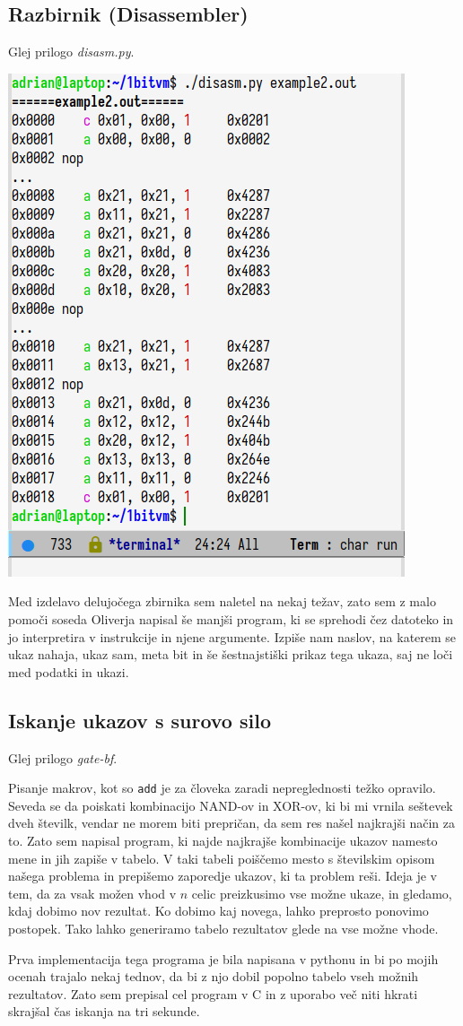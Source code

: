 \documentclass[12pt]{article}
\begin{document}
\subsection{Razbirnik (Disassembler)}
Glej prilogo \textit{disasm.py}.


\begin{center}
  \includegraphics[width=.4\linewidth]{slike/razbirnik.png}
\end{center}
\hfill
Med izdelavo delujočega zbirnika sem naletel na nekaj težav, zato sem z malo pomoči soseda Oliverja napisal še manjši program, ki se sprehodi čez datoteko in jo interpretira v instrukcije in njene argumente.
Izpiše nam naslov, na katerem se ukaz nahaja, ukaz sam, meta bit in še šestnajstiški prikaz tega ukaza, saj ne loči med podatki in ukazi.

\subsection{Iskanje ukazov s surovo silo}
Glej prilogo \textit{gate-bf}.

Pisanje makrov, kot so \texttt{add} je za človeka zaradi nepreglednosti težko opravilo.
Seveda se da poiskati kombinacijo NAND-ov in XOR-ov, ki bi mi vrnila seštevek dveh številk, vendar ne morem biti prepričan, da sem res našel najkrajši način za to.
Zato sem napisal program, ki najde najkrajše kombinacije ukazov namesto mene in jih zapiše v tabelo.
V taki tabeli poiščemo mesto s številskim opisom našega problema in prepišemo zaporedje ukazov, ki ta problem reši.
Ideja je v tem, da za vsak možen vhod v $n$ celic preizkusimo vse možne ukaze, in gledamo, kdaj dobimo nov rezultat.
Ko dobimo kaj novega, lahko preprosto ponovimo postopek.
Tako lahko generiramo tabelo rezultatov glede na vse možne vhode.

Prva implementacija tega programa je bila napisana v pythonu in bi po mojih ocenah trajalo nekaj tednov, da bi z njo dobil popolno tabelo vseh možnih rezultatov.
Zato sem prepisal cel program v C in z uporabo več niti hkrati skrajšal čas iskanja na tri sekunde.
\end{document}
